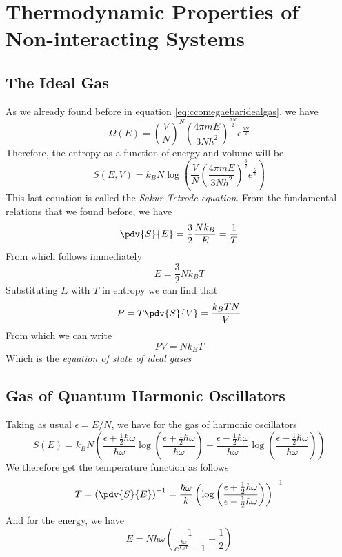\documentclass[a4paper, 11pt]{book}
\newcommand{\1}{\opr{\mathds{1}}}
\newcommand{\cc}[1]{\overline{#1}}
\theoremstyle{plain}
\begin{document}
		\section{Thermodynamic Properties of Non-interacting Systems}
		\subsection{The Ideal Gas}
		As we already found before in equation \eqref{eq:ccomegaebaridealgas}, we have
		\begin{equation*}
			\cc{\Omega}(E)=\left( \frac{V}{N} \right)^N\left( \frac{4\pi mE}{3Nh^2} \right)^{\frac{3N}{2}}e^{\frac{5N}{2}}
		\end{equation*}
		Therefore, the entropy as a function of energy and volume will be
		\begin{equation}
			S(E,V)=k_BN\log\left( \frac{V}{N}\left( \frac{4\pi mE}{3Nh^2} \right)^{\frac{3}{2}}e^{\frac{5}{2}} \right)
			\label{eq:SakurTetrode}
		\end{equation}
		This last equation is called the \textit{Sakur-Tetrode equation}. From the fundamental relations that we found before, we have
		\begin{equation}
			\pdv{S}{E}=\frac{3}{2}\frac{Nk_B}{E}=\frac{1}{T}
			\label{eq:sakurtetrodenergy}
		\end{equation}
		From which follows immediately
		\begin{equation}
			E=\frac{3}{2}Nk_BT
			\label{eq:gasenergyms}
		\end{equation}
		Substituting $E$ with $T$ in entropy we can find that
		\begin{equation}
			P=T\pdv{S}{V}=\frac{k_BTN}{V}
			\label{eq:thermaleq}
		\end{equation}
		From which we can write
		\begin{equation}
			PV=Nk_BT
			\label{eq:equationofstateidealgas}
		\end{equation}
		Which is the \textit{equation of state of ideal gases}
		\subsection{Gas of Quantum Harmonic Oscillators}
		Taking as usual $\epsilon=E/N$, we have for the gas of harmonic oscillators
		\begin{equation}
			S(E)=k_BN\left( \frac{\epsilon+\frac{1}{2}\hbar\omega}{\hbar\omega}\log\left( \frac{\epsilon+\frac{1}{2}\hbar\omega}{\hbar\omega} \right)-\frac{\epsilon-\frac{1}{2}\hbar\omega}{\hbar\omega}\log\left( \frac{\epsilon-\frac{1}{2}\hbar\omega}{\hbar\omega} \right) \right)
			\label{eq:qhogasentropy}
		\end{equation}
		We therefore get the temperature function as follows
		\begin{equation}
			T=\left( \pdv{S}{E} \right)^{-1}=\frac{\hbar\omega}{k}\left( \log\left( \frac{\epsilon+\frac{1}{2}\hbar\omega}{\epsilon-\frac{1}{2}\hbar\omega} \right) \right)^{-1}
			\label{eq:qhogastemperature}
		\end{equation}
		And for the energy, we have
		\begin{equation}
			E=N\hbar\omega\left( \frac{1}{e^{\frac{\hbar\omega}{k_BT}}-1}+\frac{1}{2} \right)
			\label{eq:qhogasenergydist}
		\end{equation}
\end{document}
